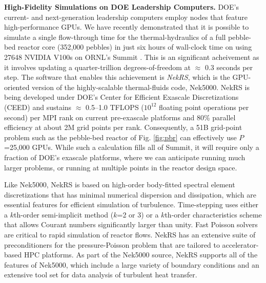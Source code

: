 \noindent
{\bf High-Fidelity Simulations on DOE Leadership Computers.}
  DOE's current- and next-generation leadership computers employ nodes that
  feature high-performance GPUs.  
We have recently demonstrated that it is possible to simulate a single
flow-through time for the thermal-hydraulics of a full pebble-bed reactor core
(352,000 pebbles) in just six hours of wall-clock time on using 27648 
NVIDIA V100s on ORNL's Summit \cite{sc22}.  This is an significant acheivement
as it involves updating a quarter-trillion degrees-of-freedom at $\approx$ 0.3
seconds per step.  The software that enables this achievement is {\em NekRS},
which is the GPU-oriented version of the highly-scalable thermal-fluids code,
Nek5000.  NekRS is being developed under DOE's Center for Efficient Exascale
Discretizations (CEED) and sustains $\approx$ 0.5--1.0 TFLOPS ($10^{12}$
floating point operations per second) per MPI rank on current pre-exascale
platforms and 80\% parallel efficiency at about 2M grid points per rank.
Consequently, a 51B grid-point problem such as the pebble-bed reactor of Fig.
\ref{fig:pbr} can effectively use $P$=25,000 GPUs. While such a calculation
fills all of Summit, it will require only a fraction of DOE's exascale
platforms, where we can anticipate running much larger problems, or running at
multiple points in the reactor design space.

Like Nek5000, NekRS is based on high-order body-fitted spectral element
discretizations that has minimal numerical dispersion and dissipation, which
are essential features for efficient simulation of turbulence.  Time-stepping
uses either a $k$th-order semi-implicit method ($k$=2 or 3) or a $k$th-order
characteristics scheme that allows Courant numbers significantly larger than
unity.  Fast Poisson solvers are critical to rapid simulation of reactor flows.
NekRS has an extensive suite of preconditioners for the pressure-Poisson
problem that are tailored to accelerator-based HPC platforms.  As part of the
Nek5000 source, NekRS supports all of the features of Nek5000, which include a
large variety of boundary conditions and an extensive tool set for data
analysis of turbulent heat transfer.



